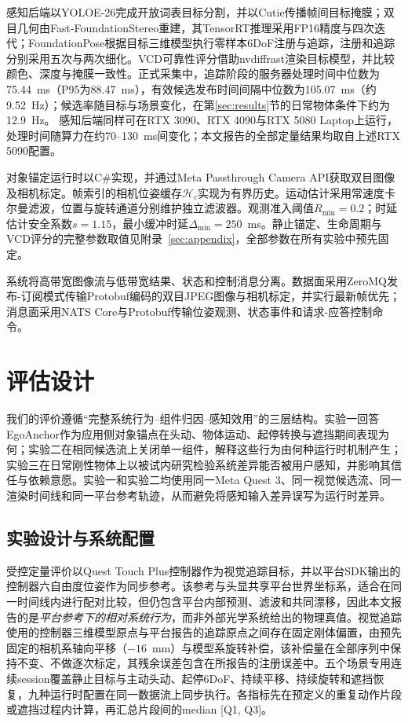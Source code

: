 \documentclass[review]{vgtc}
\begin{document}
感知后端以YOLOE-26完成开放词表目标分割，并以Cutie传播帧间目标掩膜；双目几何由Fast-FoundationStereo重建，其TensorRT推理采用FP16精度与四次迭代；FoundationPose根据目标三维模型执行零样本6DoF注册与追踪，注册和追踪分别采用五次与两次细化。VCD可靠性评分借助nvdiffrast渲染目标模型，并比较颜色、深度与掩膜一致性。正式采集中，追踪阶段的服务器处理时间中位数为75.44~ms（P95为88.47~ms），有效候选发布时间间隔中位数为105.07~ms（约9.52~Hz）；候选率随目标与场景变化，在第\ref{sec:results}节的日常物体条件下约为12.9~Hz。
感知后端同样可在RTX 3090、RTX 4090与RTX 5080 Laptop上运行，处理时间随算力在约70--130~ms间变化；本文报告的全部定量结果均取自上述RTX 5090配置。

对象锚定运行时以C\#实现，并通过Meta Passthrough Camera API获取双目图像及相机标定。帧索引的相机位姿缓存$\mathcal{H}_c$实现为有界历史。运动估计采用常速度卡尔曼滤波，位置与旋转通道分别维护独立滤波器。观测准入阈值$R_{\min} = 0.2$；时延估计安全系数$s = 1.15$，最小缓冲时延$\Delta_{\min} = 250$~ms。静止锚定、生命周期与VCD评分的完整参数取值见附录~\ref{sec:appendix}，全部参数在所有实验中预先固定。

系统将高带宽图像流与低带宽结果、状态和控制消息分离。数据面采用ZeroMQ发布-订阅模式传输Protobuf编码的双目JPEG图像与相机标定，并实行最新帧优先；消息面采用NATS Core与Protobuf传输位姿观测、状态事件和请求-应答控制命令。

\section{评估设计}\label{sec:evaluation}

我们的评价遵循“完整系统行为--组件归因--感知效用”的三层结构。实验一回答EgoAnchor作为应用侧对象锚点在头动、物体运动、起停转换与遮挡期间表现为何；实验二在相同候选流上关闭单一组件，解释这些行为由何种运行时机制产生；实验三在日常刚性物体上以被试内研究检验系统差异能否被用户感知，并影响其信任与依赖意愿。实验一和实验二均使用同一Meta Quest 3、同一视觉候选流、同一渲染时间线和同一平台参考轨迹，从而避免将感知输入差异误写为运行时差异。

\subsection{实验设计与系统配置}

受控定量评价以Quest Touch Plus控制器作为视觉追踪目标，并以平台SDK输出的控制器六自由度位姿作为同步参考。该参考与头显共享平台世界坐标系，适合在同一时间线内进行配对比较，但仍包含平台内部预测、滤波和共同漂移，因此本文报告的是\emph{平台参考下的相对系统行为}，而非外部光学系统给出的物理真值。视觉追踪使用的控制器三维模型原点与平台报告的追踪原点之间存在固定刚体偏置，由预先固定的相机系轴向平移（$-16$~mm）与模型系旋转补偿，该补偿量在全部序列中保持不变、不做逐次标定，其残余误差包含在所报告的注册误差中。五个场景专用连续session覆盖静止目标与主动头动、起停6DoF、持续平移、持续旋转和遮挡恢复，九种运行时配置在同一数据流上同步执行。各指标先在预定义的重复动作片段或遮挡过程内计算，再汇总片段间的median [Q1, Q3]。
\end{document}
